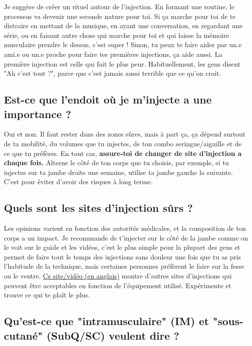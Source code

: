 \documentclass{article}
\begin{document}
Je suggère de créer un rituel autour de l'injection. En formant une routine, le processus va devenir une seconde nature pour toi. Si ça marche pour toi de te distraire en mettant de la musique, en ayant une conversation, en regardant une série, ou en faisant autre chose qui marche pour toi et qui laisse la mémoire musculaire prendre le dessus, c'est super ! Sinon, tu peux te faire aider par un.e ami.e ou un.e proche pour faire tes premières injections, ça aide aussi. La première injection est celle qui fait le plus peur. Habituellement, les gens disent "Ah c'est tout ?", parce que c'est jamais aussi terrible que ce qu'on croit.

\subsection{Est-ce que l'endoit où je m'injecte a une importance ?}

Oui et non. Il faut rester dans des zones sûres, mais à part ça, ça dépend surtout de ta mobilité, du volumes que tu injectes, de ton combo seringue/aiguille et de ce que tu préfères. En tout cas, \textbf{assure-toi de changer de site d'injection a chaque fois.} Alterne le côté de ton corps que tu choisis, par exemple, si tu injectes sur ta jambe droite une semaine, utilise ta jambe gauche la suivante. C'est pour éviter d'avoir des risques à long terme.

\subsection{Quels sont les sites d'injection sûrs ?}

Les opinions varient en fonction des autorités médicales, et la composition de ton corps a un impact. Je recommande de t'injecter sur le côté de la jambe comme on le voit sur le guide et les vidéos, c'est le plus simple pour la plupart des gens et permet de faire tout le temps des injections sans douleur une fois que tu as pris l'habitude de la technique, mais certaines personnes préfèrent le faire sur la fesse ou le ventre. \href{https://vertisis.com/articles/how-to-self-administer-a-subcutaneous-injection}{Ce site/vidéo (en anglais)} montre d'autres sites d'injections qui peuvent être acceptables en fonction de l'équipement utilisé. Expérimente et trouve ce qui te plaît le plus.

\subsection{Qu'est-ce que "intramusculaire" (IM) et "sous-cutané" (SubQ/SC) veulent dire ?}
\end{document}
